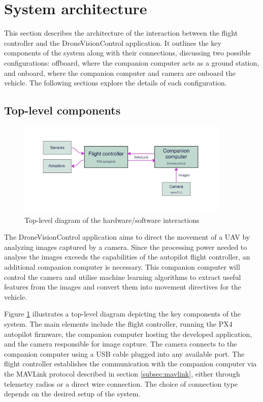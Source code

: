 \section{System architecture}
\label{sec:sysarch}

This section describes the architecture of the interaction between the flight controller and the DroneVisionControl application. It outlines the key components of the system along with their connections, discussing two possible configurations: offboard, where the companion computer acts as a ground station, and onboard, where the companion computer and camera are onboard the vehicle. The following sections explore the details of each configuration.

\subsection{Top-level components}

\begin{figure}
  \centering
  \includegraphics[width=0.9\textwidth,keepaspectratio]{img/sys-arch-diagram.jpg}
  \caption{Top-level diagram of the hardware/software interactions}
  \label{fig:toplevel}
\end{figure}


The DroneVisionControl application aims to direct the movement of a UAV by analyzing images captured by a camera. Since the processing power needed to analyse the images exceeds the capabilities of the autopilot flight controller, an additional companion computer is necessary. This companion computer will control the camera and utilise machine learning algorithms to extract useful features from the images and convert them into movement directives for the vehicle.

Figure \ref{fig:toplevel} illustrates a top-level diagram depicting the key components of the system. The main elements include the flight controller, running the PX4 autopilot firmware, the companion computer hosting the developed application, and the camera responsible for image capture.  The camera connects to the companion computer using a USB cable plugged into any available port. The flight controller establishes the communication with the companion computer via the MAVLink protocol described in section \ref{subsec:mavlink}, either through telemetry radios or a direct wire connection. The choice of connection type depends on the desired setup of the system.

